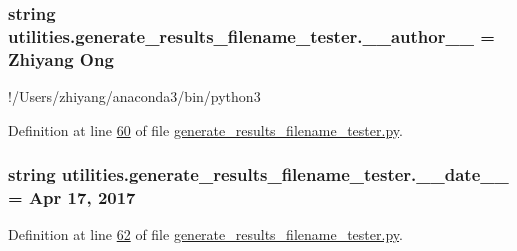 \subsubsection[{\+\_\+\+\_\+author\+\_\+\+\_\+}]{\setlength{\rightskip}{0pt plus 5cm}string utilities.\+generate\+\_\+results\+\_\+filename\+\_\+tester.\+\_\+\+\_\+author\+\_\+\+\_\+ = \textquotesingle{}Zhiyang Ong\textquotesingle{}}\label{namespaceutilities_1_1generate__results__filename__tester_aeb3c7d9ee34db57c409e693157f0cceb}


!/\+Users/zhiyang/anaconda3/bin/python3 



Definition at line \hyperlink{generate__results__filename__tester_8py_source_l00060}{60} of file \hyperlink{generate__results__filename__tester_8py_source}{generate\+\_\+results\+\_\+filename\+\_\+tester.\+py}.

\hypertarget{namespaceutilities_1_1generate__results__filename__tester_afe7e0ae314b84c1b0fc443a6dcbc6ba3}{}
\subsubsection[{\+\_\+\+\_\+date\+\_\+\+\_\+}]{\setlength{\rightskip}{0pt plus 5cm}string utilities.\+generate\+\_\+results\+\_\+filename\+\_\+tester.\+\_\+\+\_\+date\+\_\+\+\_\+ = \textquotesingle{}Apr 17, 2017\textquotesingle{}}\label{namespaceutilities_1_1generate__results__filename__tester_afe7e0ae314b84c1b0fc443a6dcbc6ba3}


Definition at line \hyperlink{generate__results__filename__tester_8py_source_l00062}{62} of file \hyperlink{generate__results__filename__tester_8py_source}{generate\+\_\+results\+\_\+filename\+\_\+tester.\+py}.

\hypertarget{namespaceutilities_1_1generate__results__filename__tester_a36b6e38cf86170c416ee9e059c4579ee}{}
